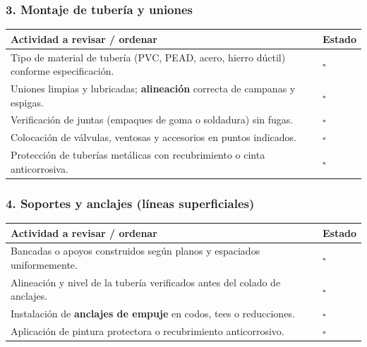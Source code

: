\documentclass[12pt]{article}
\newcommand{\cbox}{\(\square\)}
\renewcommand{\cbox}{\(\square\)} %
\begin{document}
	\subsubsection*{3. Montaje de tubería y uniones}
	\begin{tabularx}{\linewidth}{>{\raggedright\arraybackslash}p{0.93\linewidth} >{\centering\arraybackslash}m{0.07\linewidth}}
		\toprule
		\textbf{Actividad a revisar / ordenar} & \textbf{Estado}\\
		\midrule
		Tipo de material de tubería (PVC, PEAD, acero, hierro dúctil) conforme especificación. & \cbox \\
		Uniones limpias y lubricadas; \textbf{alineación} correcta de campanas y espigas. & \cbox \\
		Verificación de juntas (empaques de goma o soldadura) sin fugas. & \cbox \\
		Colocación de válvulas, ventosas y accesorios en puntos indicados. & \cbox \\
		Protección de tuberías metálicas con recubrimiento o cinta anticorrosiva. & \cbox \\
		\bottomrule
	\end{tabularx}
	
	\subsubsection*{4. Soportes y anclajes (líneas superficiales)}
	\begin{tabularx}{\linewidth}{>{\raggedright\arraybackslash}p{0.93\linewidth} >{\centering\arraybackslash}m{0.07\linewidth}}
		\toprule
		\textbf{Actividad a revisar / ordenar} & \textbf{Estado}\\
		\midrule
		Bancadas o apoyos construidos según planos y espaciados uniformemente. & \cbox \\
		Alineación y nivel de la tubería verificados antes del colado de anclajes. & \cbox \\
		Instalación de \textbf{anclajes de empuje} en codos, tees o reducciones. & \cbox \\
		Aplicación de pintura protectora o recubrimiento anticorrosivo. & \cbox \\
		\bottomrule
	\end{tabularx}
	
\end{document}
